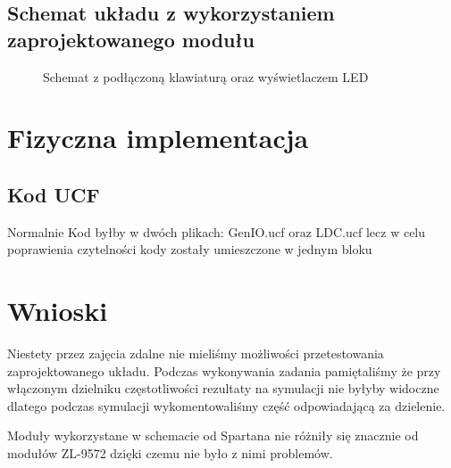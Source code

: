 \documentclass[a4paper,12pt]{extarticle}  %
\begin{document}
 \subsection{Schemat układu z wykorzystaniem zaprojektowanego modułu}
 \begin{figure}[H]
	 \centering
	 \caption{Schemat z podłączoną klawiaturą oraz wyświetlaczem LED}
  \end{figure}
\section{Fizyczna implementacja}
\subsection{Kod UCF}
Normalnie Kod byłby w dwóch plikach:
GenIO.ucf oraz LDC.ucf lecz w celu poprawienia czytelności kody zostały umieszczone w jednym bloku 


\section{Wnioski}
Niestety przez zajęcia zdalne nie mieliśmy możliwości przetestowania zaprojektowanego układu.
Podczas wykonywania zadania pamiętaliśmy że przy włączonym dzielniku częstotliwości rezultaty na symulacji nie byłyby widoczne dlatego 
podczas symulacji wykomentowaliśmy część odpowiadającą za dzielenie.

Moduły wykorzystane w schemacie od Spartana nie różniły się znacznie od modułów ZL-9572 dzięki czemu nie było z nimi problemów.
\end{document}
